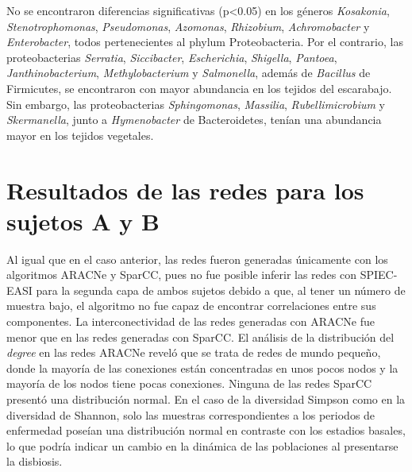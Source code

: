 \documentclass[
]{book}
\begin{document}
No se encontraron diferencias significativas (p\textless0.05) en los géneros \emph{Kosakonia}, \emph{Stenotrophomonas}, \emph{Pseudomonas}, \emph{Azomonas}, \emph{Rhizobium}, \emph{Achromobacter} y \emph{Enterobacter}, todos pertenecientes al phylum Proteobacteria. Por el contrario, las proteobacterias \emph{Serratia}, \emph{Siccibacter}, \emph{Escherichia}, \emph{Shigella}, \emph{Pantoea}, \emph{Janthinobacterium}, \emph{Methylobacterium} y \emph{Salmonella}, además de \emph{Bacillus} de Firmicutes, se encontraron con mayor abundancia en los tejidos del escarabajo. Sin embargo, las proteobacterias \emph{Sphingomonas}, \emph{Massilia}, \emph{Rubellimicrobium} y \emph{Skermanella}, junto a \emph{Hymenobacter} de Bacteroidetes, tenían una abundancia mayor en los tejidos vegetales.

\hypertarget{resultados-de-las-redes-para-los-sujetos-a-y-b}{%
\section*{Resultados de las redes para los sujetos A y B}\label{resultados-de-las-redes-para-los-sujetos-a-y-b}}

Al igual que en el caso anterior, las redes fueron generadas únicamente con los algoritmos ARACNe y SparCC, pues no fue posible inferir las redes con SPIEC-EASI para la segunda capa de ambos sujetos debido a que, al tener un número de muestra bajo, el algoritmo no fue capaz de encontrar correlaciones entre sus componentes. La interconectividad de las redes generadas con ARACNe fue menor que en las redes generadas con SparCC. El análisis de la distribución del \emph{degree} en las redes ARACNe reveló que se trata de redes de mundo pequeño, donde la mayoría de las conexiones están concentradas en unos pocos nodos y la mayoría de los nodos tiene pocas conexiones. Ninguna de las redes SparCC presentó una distribución normal. En el caso de la diversidad Simpson como en la diversidad de Shannon, solo las muestras correspondientes a los periodos de enfermedad poseían una distribución normal en contraste con los estadios basales, lo que podría indicar un cambio en la dinámica de las poblaciones al presentarse la disbiosis.
\end{document}
